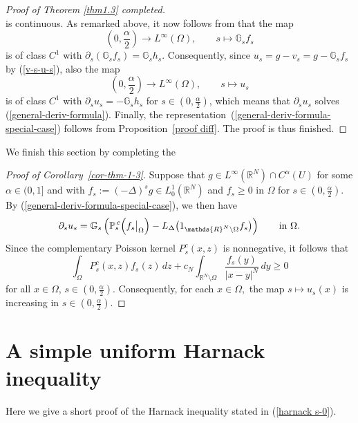 \documentclass[notitlepage,11pt,reqno]{amsart}
\theoremstyle{definition}
\numberwithin{equation}{section}
\newcommand{\cGs}{{\mathbb G}}
\newcommand{\cPs}{{{\mathbb P}_s}}
\newcommand{\R}{\mathds{R}}
\newcommand{\RR}{\mathds{R}}
\begin{document}
\begin{proof}[Proof of Theorem \ref{thm1.3} completed]
$$ $$
 is continuous. As remarked above, it now follows from \cite[Lemma 6.6]{JSW20} that the map
 $$
    (0,\frac{\alpha}{2}) \to L^\infty(\Omega), \qquad s \mapsto \cGs_s f_s
    $$
    is of class $C^1$ with $\partial_s (\cGs_s f_s) = \cGs_s h_s$. Consequently, since $u_s = g - v_s = g- \cGs_s f_s$ by (\ref{v-s-u-s}), also the map
 $$
    (0,\frac{\alpha}{2}) \to L^\infty(\Omega), \qquad s \mapsto u_s
    $$
    is of class $C^1$ with $\partial_s u_s = -\cGs_s h_s$ for $s \in (0,\frac{\alpha}{2})$, which means that $\partial_s u_s$ solves (\ref{general-deriv-formula}). Finally, the representation~(\ref{general-deriv-formula-special-case}) follows from Proposition~\ref{proof diff}. The proof is thus finished.
\end{proof}


We finish this section by completing the

\begin{proof}[Proof of Corollary~\ref{cor-thm-1-3}]
Suppose that $g \in L^{\infty}(\RR^N) \cap C^{\alpha}(U)$ for some $\alpha \in(0,1]$ and with $f_s:= (-\Delta)^s g \in L^1_0(\R^N)$ and $f_s \geq 0$ in $\Omega$ for $s \in (0,\frac{\alpha}{2})$.
By (\ref{general-deriv-formula-special-case}), we then have
$$
\partial_s u_s = \cGs_s \left(\cPs^{\!\! c}\Bigl(f_s \big|_{\Omega}\Bigr)- L_\Delta \bigl(1_{\R^N \setminus \Omega}f_s \bigr)\right)\qquad\text{in $\Omega$.}
$$
Since the complementary Poisson kernel $P_s^{c}(x,z)$ is nonnegative, it follows that 
$$
 \int_{\Omega}P_s^{c}(x,z)f_s(z)\,dz + c_N \int_{\R^N \setminus \Omega}\frac{f_s(y)}{|x-y|^N}\,dy \ge 0 
$$
for all $x \in \Omega$, $s \in (0,\frac{\alpha}{2})$. Consequently, for each $x\in \Omega,$  the map $s \mapsto u_s(x)$ is increasing in $s \in (0, \frac{\alpha}{2})$.
\end{proof}





\appendix


\section{A simple uniform Harnack inequality}\label{short proof of harnack}

Here we give a short proof of the Harnack inequality stated in (\ref{harnack s-0}).
\end{document}
